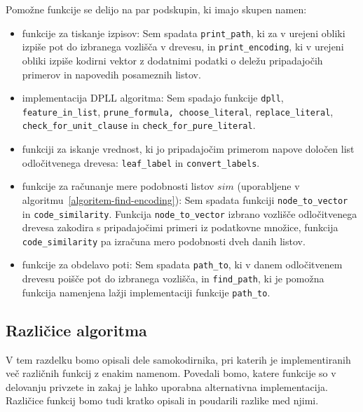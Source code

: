 \documentclass[12pt,a4paper,twoside]{article}
\theoremstyle{definition} %
\theoremstyle{plain} %
\numberwithin{equation}{section}  %
\begin{document}
Pomožne funkcije se delijo na par podskupin, ki imajo skupen namen:
\begin{itemize}
	\item funkcije za tiskanje izpisov: Sem spadata \texttt{print\_path}, ki za v urejeni obliki izpiše pot do izbranega vozlišča v drevesu, in 
	\texttt{print\_encoding}, ki v urejeni obliki izpiše kodirni vektor z dodatnimi podatki o deležu pripadajočih primerov in napovedih posameznih listov.

	\item implementacija DPLL algoritma: Sem spadajo funkcije \texttt{dpll}, \texttt{feature\_\-in\_\-list}, \texttt{prune\_\-formula, choose\_\-literal}, 
	\texttt{replace\_\-literal}, \texttt{check\_\-for\_\-un\-it\_\-clause} in \texttt{check\_\-for\_\-pure\_\-literal}.
	
	\item funkciji za iskanje vrednost, ki jo pripadajočim primerom napove določen list odločitvenega drevesa: \texttt{leaf\_\-label} in \texttt{convert\_\-labels}.
	
	\item funkcije za računanje mere podobnosti listov $sim$ (uporabljene v algoritmu~\ref{algoritem-find-encoding}): 
	Sem spadata funkciji \texttt{node\_\-to\_\-vector} in \texttt{code\_\-similarity}.
	Funkcija \texttt{node\_\-to\_\-vector} izbrano vozlišče odločitvenega drevesa zakodira s pripadajočimi primeri iz podatkovne množice, %
	funkcija \texttt{code\_\-similarity} pa izračuna mero podobnosti dveh danih listov.
	
	\item funkcije za obdelavo poti: Sem spadata \texttt{path\_\-to}, ki v danem odločitvenem drevesu poišče pot do izbranega vozlišča, 
	in \texttt{find\_\-path}, ki je pomožna funkcija namenjena lažji implementaciji funkcije \texttt{path\_\-to}.
\end{itemize}


\subsection{Različice algoritma}

V tem razdelku bomo opisali dele samokodirnika, pri katerih je implementiranih več različnih funkcij z enakim namenom.
Povedali bomo, katere funkcije so v delovanju privzete in zakaj je lahko uporabna alternativna implementacija.
Različice funkcij bomo tudi kratko opisali in poudarili razlike med njimi.
\end{document}
